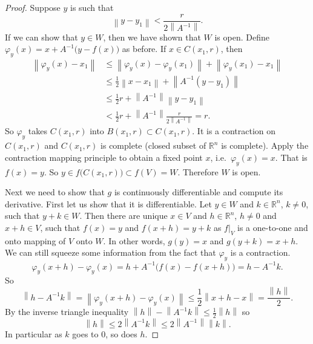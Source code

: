 \documentclass[12pt]{book}
\newcommand{\norm}[1]{\left\lVert {#1} \right\rVert}
\newcommand{\R}{{\mathbb{R}}}
\theoremstyle{plain}
\theoremstyle{remark}
\theoremstyle{definition}
\theoremstyle{exercise}
\theoremstyle{example}
\begin{document}
\begin{proof}
Suppose $y$ is such that
\begin{equation*}
\norm{y-y_1} <
\frac{r}{2\norm{A^{-1}}} .
\end{equation*}
If we can show that $y \in W$, then we have shown that $W$ is open.
Define $\varphi_y(x) = x+A^{-1}\bigl(y-f(x)\bigr)$ as before.  If $x \in
C(x_1,r)$, then
\begin{equation*}
\begin{split}
\norm{\varphi_y(x)-x_1}
& \leq
\norm{\varphi_y(x)-\varphi_y(x_1)} +
\norm{\varphi_y(x_1)-x_1} \\
& \leq
\frac{1}{2}\norm{x-x_1} +
\norm{A^{-1}(y-y_1)} \\
& \leq
\frac{1}{2}r +
\norm{A^{-1}}\norm{y-y_1} \\
& <
\frac{1}{2}r +
\norm{A^{-1}}
\frac{r}{2\norm{A^{-1}}} = r .
\end{split}
\end{equation*}
So $\varphi_y$ takes $C(x_1,r)$ into $B(x_1,r) \subset C(x_1,r)$.  It is a
contraction on $C(x_1,r)$ and $C(x_1,r)$ is complete (closed subset of $\R^n$
is complete).
Apply the contraction mapping principle to obtain a fixed point $x$,
i.e.\ $\varphi_y(x) = x$.  That is $f(x) = y$.  So $y \in
f\bigl(C(x_1,r)\bigr) \subset f(V) = W$.  Therefore $W$ is open.

Next we need to show that $g$ is continuously differentiable and compute
its derivative.  First let us show that it is differentiable.
Let $y \in W$ and $k \in \R^n$, $k\not= 0$, such that $y+k \in W$.  Then
there are unique
$x \in V$ and $h \in \R^n$, $h \not= 0$ and $x+h \in V$, such that
$f(x) = y$ and $f(x+h) = y+k$ as $f|_V$ is a one-to-one and onto mapping of $V$
onto $W$.  In other words, $g(y) = x$ and $g(y+k) = x+h$.  We can still
squeeze some information from the fact that $\varphi_y$ is a contraction.
\begin{equation*}
\varphi_y(x+h)-\varphi_y(x) = h + A^{-1} \bigl( f(x)-f(x+h) \bigr) = h - A^{-1} k .
\end{equation*}
So
\begin{equation*}
\norm{h-A^{-1}k} = \norm{\varphi_y(x+h)-\varphi_y(x)} \leq
\frac{1}{2}\norm{x+h-x} = \frac{\norm{h}}{2}.
\end{equation*}
By the inverse triangle inequality $\norm{h} - \norm{A^{-1}k} \leq
\frac{1}{2}\norm{h}$ so
\begin{equation*}
\norm{h} \leq 2 \norm{A^{-1}k} \leq 2 \norm{A^{-1}} \norm{k}.
\end{equation*}
In particular as $k$ goes to 0, so does $h$.


\end{proof}
\end{document}
